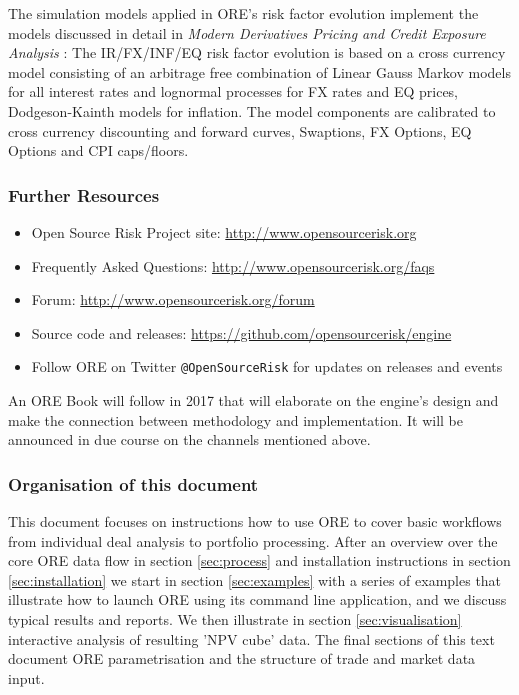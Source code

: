 \documentclass[12pt, a4paper]{article}
\begin{document}
\medskip The simulation models applied in ORE's risk factor evolution implement the models discussed in detail in {\em
  Modern Derivatives Pricing and Credit Exposure Analysis} \cite{Lichters}: The IR/FX/INF/EQ risk factor evolution is based on
a cross currency model consisting of an arbitrage free combination of Linear Gauss Markov models for all interest rates
and lognormal processes for FX rates and EQ prices, Dodgeson-Kainth models for inflation. The model components are calibrated to cross currency discounting and forward curves, Swaptions, FX Options, EQ Options and CPI caps/floors.

\subsubsection*{Further Resources}
\begin{itemize}
\item Open Source Risk Project site: \url{http://www.opensourcerisk.org}
\item Frequently Asked Questions: \url{http://www.opensourcerisk.org/faqs}
\item Forum: \url{http://www.opensourcerisk.org/forum}
\item Source code and releases: \url{https://github.com/opensourcerisk/engine}
\item Follow ORE on Twitter {\tt @OpenSourceRisk} for updates on releases and events
\end{itemize}
An ORE Book will follow in 2017 that will elaborate on the engine's design and make the connection between methodology
and implementation. It will be announced in due course on the channels mentioned above.
 
\subsubsection*{Organisation of this document}

This document focuses on instructions how to use ORE to cover basic workflows from individual deal analysis to portfolio
processing. After an overview over the core ORE data flow in section \ref{sec:process} and installation instructions in
section \ref{sec:installation} we start in section \ref{sec:examples} with a series of examples that illustrate how to
launch ORE using its command line application, and we discuss typical results and reports. We then illustrate in section
\ref{sec:visualisation} interactive analysis of resulting 'NPV cube' data. The final sections of this text document ORE
parametrisation and the structure of trade and market data input.
\end{document}
